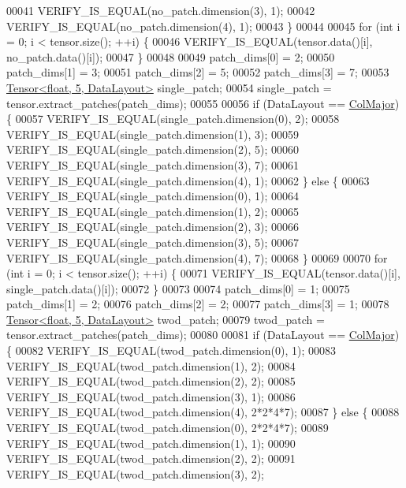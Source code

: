 \begin{DoxyCode}
00041     VERIFY\_IS\_EQUAL(no\_patch.dimension(3), 1);
00042     VERIFY\_IS\_EQUAL(no\_patch.dimension(4), 1);
00043   \}
00044 
00045   \textcolor{keywordflow}{for} (\textcolor{keywordtype}{int} i = 0; i < tensor.size(); ++i) \{
00046     VERIFY\_IS\_EQUAL(tensor.data()[i], no\_patch.data()[i]);
00047   \}
00048 
00049   patch\_dims[0] = 2;
00050   patch\_dims[1] = 3;
00051   patch\_dims[2] = 5;
00052   patch\_dims[3] = 7;
00053   \hyperlink{class_eigen_1_1_tensor}{Tensor<float, 5, DataLayout>} single\_patch;
00054   single\_patch = tensor.extract\_patches(patch\_dims);
00055 
00056   \textcolor{keywordflow}{if} (DataLayout == \hyperlink{group__enums_ggaacded1a18ae58b0f554751f6cdf9eb13a0cbd4bdd0abcfc0224c5fcb5e4f6669a}{ColMajor}) \{
00057     VERIFY\_IS\_EQUAL(single\_patch.dimension(0), 2);
00058     VERIFY\_IS\_EQUAL(single\_patch.dimension(1), 3);
00059     VERIFY\_IS\_EQUAL(single\_patch.dimension(2), 5);
00060     VERIFY\_IS\_EQUAL(single\_patch.dimension(3), 7);
00061     VERIFY\_IS\_EQUAL(single\_patch.dimension(4), 1);
00062   \} \textcolor{keywordflow}{else} \{
00063     VERIFY\_IS\_EQUAL(single\_patch.dimension(0), 1);
00064     VERIFY\_IS\_EQUAL(single\_patch.dimension(1), 2);
00065     VERIFY\_IS\_EQUAL(single\_patch.dimension(2), 3);
00066     VERIFY\_IS\_EQUAL(single\_patch.dimension(3), 5);
00067     VERIFY\_IS\_EQUAL(single\_patch.dimension(4), 7);
00068   \}
00069 
00070   \textcolor{keywordflow}{for} (\textcolor{keywordtype}{int} i = 0; i < tensor.size(); ++i) \{
00071     VERIFY\_IS\_EQUAL(tensor.data()[i], single\_patch.data()[i]);
00072   \}
00073 
00074   patch\_dims[0] = 1;
00075   patch\_dims[1] = 2;
00076   patch\_dims[2] = 2;
00077   patch\_dims[3] = 1;
00078   \hyperlink{class_eigen_1_1_tensor}{Tensor<float, 5, DataLayout>} twod\_patch;
00079   twod\_patch = tensor.extract\_patches(patch\_dims);
00080 
00081   \textcolor{keywordflow}{if} (DataLayout == \hyperlink{group__enums_ggaacded1a18ae58b0f554751f6cdf9eb13a0cbd4bdd0abcfc0224c5fcb5e4f6669a}{ColMajor}) \{
00082     VERIFY\_IS\_EQUAL(twod\_patch.dimension(0), 1);
00083     VERIFY\_IS\_EQUAL(twod\_patch.dimension(1), 2);
00084     VERIFY\_IS\_EQUAL(twod\_patch.dimension(2), 2);
00085     VERIFY\_IS\_EQUAL(twod\_patch.dimension(3), 1);
00086     VERIFY\_IS\_EQUAL(twod\_patch.dimension(4), 2*2*4*7);
00087   \} \textcolor{keywordflow}{else} \{
00088     VERIFY\_IS\_EQUAL(twod\_patch.dimension(0), 2*2*4*7);
00089     VERIFY\_IS\_EQUAL(twod\_patch.dimension(1), 1);
00090     VERIFY\_IS\_EQUAL(twod\_patch.dimension(2), 2);
00091     VERIFY\_IS\_EQUAL(twod\_patch.dimension(3), 2);

\end{DoxyCode}
